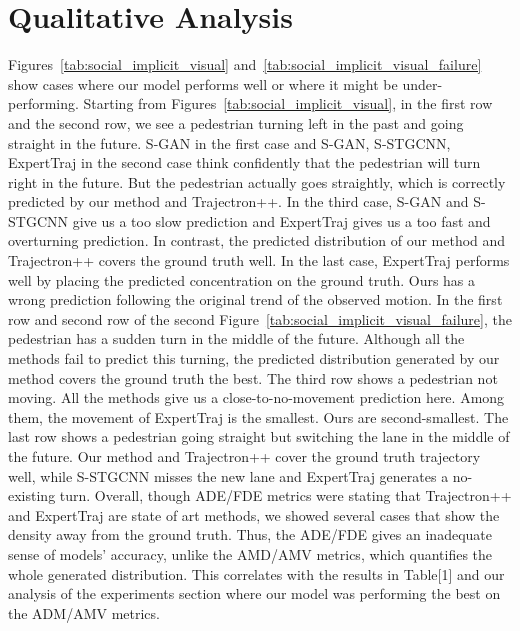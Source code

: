 \documentclass[runningheads]{llncs}
\begin{document}
\section{Qualitative Analysis}
Figures~\ref{tab:social_implicit_visual} and~\ref{tab:social_implicit_visual_failure} show cases where our model performs well or where it might be under-performing. 
Starting from Figures~\ref{tab:social_implicit_visual}, in the first row and the second row, we see a pedestrian turning left in the past and going straight in the future. S-GAN in the first case and S-GAN, S-STGCNN, ExpertTraj in the second case think confidently that the pedestrian will turn right in the future. But the pedestrian actually goes straightly, which is correctly predicted by our method and Trajectron++. 
In the third case, S-GAN and S-STGCNN give us a too slow prediction and ExpertTraj gives us a too fast and overturning prediction. In contrast, the predicted distribution of our method and Trajectron++ covers the ground truth well.
In the last case, ExpertTraj performs well by placing the predicted concentration on the ground truth. Ours has a wrong prediction following the original trend of the observed motion. 
In the first row and second row of the second Figure~\ref{tab:social_implicit_visual_failure}, the pedestrian has a sudden turn in the middle of the future. Although all the methods fail to predict this turning, the predicted distribution generated by our method covers the ground truth the best.
The third row shows a pedestrian not moving. All the methods give us a close-to-no-movement prediction here. Among them, the movement of ExpertTraj is the smallest. Ours are second-smallest. 
The last row shows a pedestrian going straight but switching the lane in the middle of the future. Our method and Trajectron++ cover the ground truth trajectory well, while S-STGCNN misses the new lane and ExpertTraj generates a no-existing turn.
Overall, though ADE/FDE metrics were stating that Trajectron++ and ExpertTraj are state of art methods, we showed several cases that show the density away from the ground truth. Thus, the ADE/FDE gives an inadequate sense of models' accuracy, unlike the AMD/AMV metrics, which quantifies the whole generated distribution. This correlates with the results in Table[1] and our analysis of the experiments section where our model was performing the best on the ADM/AMV metrics.
\end{document}
